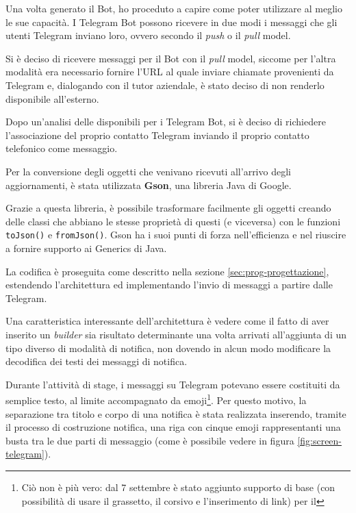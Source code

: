 Una volta generato il Bot, ho proceduto a capire come poter utilizzare al
meglio le sue capacità. I Telegram Bot possono ricevere in due modi i messaggi
che gli utenti Telegram inviano loro, ovvero secondo il \emph{push} o il
\emph{pull} model.

Si è deciso di ricevere messaggi per il Bot con il \emph{pull} model, siccome
per l'altra modalità era necessario fornire l'URL al quale inviare chiamate
 provenienti da Telegram e, dialogando con il tutor aziendale, è
stato deciso di non renderlo disponibile all'esterno.

Dopo un'analisi delle  disponibili per i Telegram Bot, si è deciso
di richiedere l'associazione del proprio contatto Telegram inviando il proprio
contatto telefonico come messaggio.

Per la conversione degli oggetti  che venivano ricevuti all'arrivo
degli aggiornamenti, è stata utilizzata \textbf{Gson}, una libreria Java di
Google.

Grazie a questa libreria, è possibile trasformare facilmente gli oggetti
 creando delle classi che abbiano le stesse proprietà di questi (e
viceversa) con le funzioni \texttt{toJson()} e \texttt{fromJson()}. Gson ha i
suoi punti di forza nell'efficienza e nel riuscire a fornire supporto ai
Generics di Java.

La codifica è proseguita come descritto nella sezione
\ref{sec:prog-progettazione}, estendendo l'architettura ed implementando
l'invio di messaggi a partire dalle  Telegram.

Una caratteristica interessante dell'architettura è vedere come il fatto di
aver inserito un \emph{builder} sia risultato determinante una volta arrivati
all'aggiunta di un tipo diverso di modalità di notifica, non dovendo in alcun
modo modificare la decodifica dei testi dei messaggi di notifica.

Durante l'attività di stage, i messaggi su Telegram potevano essere costituiti
da semplice testo, al limite accompagnato da emoji\footnote{Ciò non è più
vero: dal 7 settembre è stato aggiunto supporto di base (con possibilità di
usare il grassetto, il corsivo e l'inserimento di link) per il
}. Per questo motivo, la separazione tra titolo e corpo di una
notifica è stata realizzata inserendo, tramite il processo di costruzione
notifica, una riga con cinque emoji rappresentanti una busta tra le due parti
di messaggio (come è possibile vedere in figura \ref{fig:screen-telegram}).


